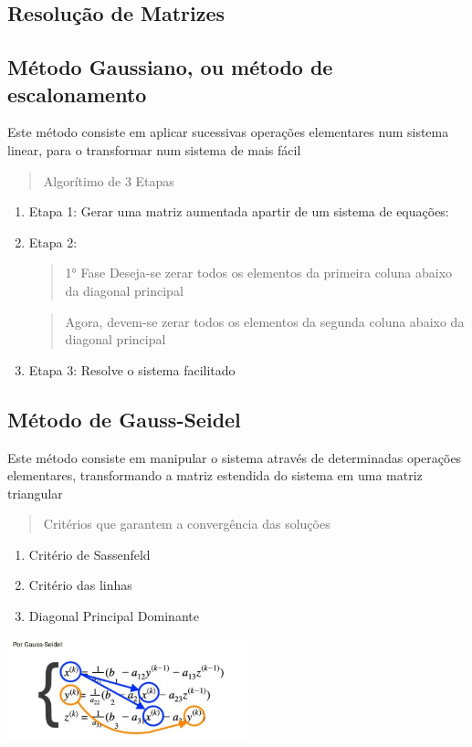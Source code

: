 \documentclass{article}
\begin{document}
\begin{multicols}{2}
\section{Resolução de Matrizes}
        \subsection{Método Gaussiano, ou método de \\escalonamento}
        Este método consiste em aplicar sucessivas operações elementares num sistema linear, para o transformar num sistema de mais fácil
        
        \begin{quote}
            Algorítimo de 3 Etapas
        \end{quote}
        \begin{enumerate}
            \item Etapa 1: Gerar uma matriz aumentada apartir de um sistema de equações:
            \item Etapa 2: 
            \begin{quote}
                1° Fase Deseja-se zerar todos os elementos da primeira coluna abaixo da diagonal principal
            \end{quote}
            \begin{quote}
                Agora, devem-se zerar todos os elementos da segunda coluna abaixo da diagonal principal
            \end{quote}
            \item Etapa 3: Resolve o sistema facilitado
        \end{enumerate}
        
        \subsection{Método de Gauss-Seidel}
        Este método consiste em manipular o sistema através de determinadas operações elementares, transformando a matriz estendida do sistema em uma matriz triangular

        \begin{quote}
            Critérios que garantem a convergência das soluções
        \end{quote}
        \begin{enumerate}
            \item Critério de Sassenfeld
            \item Critério das linhas
            \item Diagonal Principal Dominante
        \end{enumerate}

        \hbox{\includegraphics[width=7cm]{Gauss-Seidel.jpg}}
    
\end{multicols}
\end{document}
